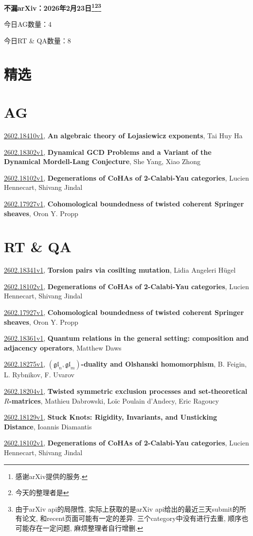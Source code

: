 \documentclass[9pt, a4paper]{article}
\theoremstyle{plain}
\theoremstyle{definition}
\theoremstyle{remark}
\newcommand{\arxiv}[3]{\href{https://arxiv.org/abs/#1}{#1}, \textbf{\textcolor{arxivblue}{#2}}, #3}
\newcommand{\AGnumber}{4}
\newcommand{\RTQAnumber}{8}
\newcommand{\NewestDate}{2026年2月23日}
\newcommand{\todayarXiver}{} %
\begin{document}
\begin{center}
    \Huge\textbf{不漏arXiv：\NewestDate\footnote{感谢arXiv提供的服务.}\footnote{今天的整理者是\todayarXiver}\footnote{由于arXiv api的局限性, 实际上获取的是arXiv api给出的最近三天submit的所有论文, 和recent页面可能有一定的差异. 三个category中没有进行去重, 顺序也可能存在一定问题, 麻烦整理者自行增删.}} \\
\end{center}

\setcounter{section}{-1}

\begin{center}
    今日AG数量：\AGnumber
    
    今日RT \& QA数量：\RTQAnumber
    
\end{center}


\section{精选}


\section{AG}
\arxiv{2602.18410v1}{An algebraic theory of Lojasiewicz exponents}{Tai Huy Ha}

\arxiv{2602.18302v1}{Dynamical GCD Problems and a Variant of the Dynamical Mordell-Lang Conjecture}{She Yang, Xiao Zhong}

\arxiv{2602.18102v1}{Degenerations of CoHAs of 2-Calabi-Yau categories}{Lucien Hennecart, Shivang Jindal}

\arxiv{2602.17927v1}{Cohomological boundedness of twisted coherent Springer sheaves}{Oron Y. Propp}


\section{RT \& QA}
\arxiv{2602.18341v1}{Torsion pairs via cosilting mutation}{Lidia Angeleri Hügel}

\arxiv{2602.18102v1}{Degenerations of CoHAs of 2-Calabi-Yau categories}{Lucien Hennecart, Shivang Jindal}

\arxiv{2602.17927v1}{Cohomological boundedness of twisted coherent Springer sheaves}{Oron Y. Propp}

\arxiv{2602.18361v1}{Quantum relations in the general setting: composition and adjacency operators}{Matthew Daws}

\arxiv{2602.18275v1}{$(\mathfrak{gl}_{n},\mathfrak{gl}_{m})$-duality and Olshanski homomorphism}{B. Feigin, L. Rybnikov, F. Uvarov}

\arxiv{2602.18204v1}{Twisted symmetric exclusion processes and set-theoretical $R$-matrices}{Mathieu Dabrowski, Loïc Poulain d'Andecy, Eric Ragoucy}

\arxiv{2602.18129v1}{Stuck Knots: Rigidity, Invariants, and Unsticking Distance}{Ioannis Diamantis}

\arxiv{2602.18102v1}{Degenerations of CoHAs of 2-Calabi-Yau categories}{Lucien Hennecart, Shivang Jindal}

\end{document}
